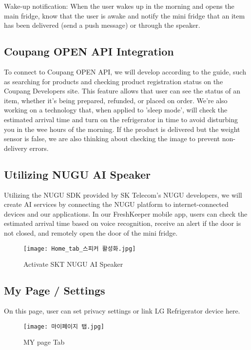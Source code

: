 \documentclass[conference]{IEEEtran}
\begin{document}
Wake-up notification: When the user wakes up in the morning and opens the main fridge, know that the user is awake and notify the mini fridge that an item has been delivered (send a push message) or through the speaker.


\subsection{Coupang OPEN API Integration}
To connect to Coupang OPEN API, we will develop according to the guide, such as searching for products and checking product registration status on the Coupang Developers site. This feature allows that user can see the status of an item, whether it's being prepared, refunded, or placed on order. We're also working on a technology that, when applied to 'sleep mode', will check the estimated arrival time and turn on the refrigerator in time to avoid disturbing you in the wee hours of the morning. If the product is delivered but the weight sensor is false, we are also thinking about checking the image to prevent non-delivery errors. 
\subsection{Utilizing NUGU AI Speaker}
Utilizing the NUGU SDK provided by SK Telecom's NUGU developers, we will create AI services by connecting the NUGU platform to internet-connected devices and our applications. 
In our FreshKeeper mobile app, users can check the estimated arrival time based on voice recognition, receive an alert if the door is not closed, and remotely open the door of the mini fridge. 
    \begin{figure}[h]
        \centerline{\texttt{[image: Home\_tab\_스피커 활성화.jpg]}}
    \label{fig}
    \caption{Activate SKT NUGU AI Speaker}
    \end{figure}

\subsection{My Page / Settings}
On this page, user can set privacy settings or link LG Refrigerator device here.
    \begin{figure}[h]
    \centerline{
        \texttt{[image: 마이페이지 탭.jpg]}
    }
    \label{fig}
    \caption{MY page Tab}
    \end{figure}
\end{document}
